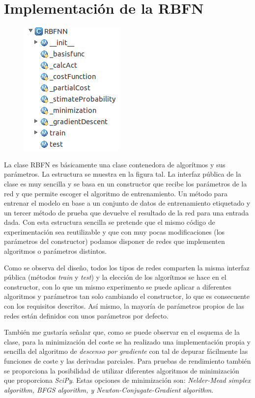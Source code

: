 \documentclass[10pt,a4paper]{report}
\begin{document}
\section{Implementación de la RBFN}
\begin{figure}[!h]{}
    \centering
    \includegraphics[scale=0.6]{img/RBFNScheme.png}
\end{figure}
La clase RBFN es básicamente una clase contenedora de algorítmos y sus parámetros. La estructura se muestra en la figura tal. La interfaz pública de la clase es muy sencilla y se basa en un constructor que recibe los parámetros de la red y que permite escoger el algoritmo de entrenamiento. Un método para entrenar el modelo en base a un conjunto de datos de entrenamiento etiquetado y un tercer método de prueba que devuelve el resultado de la red para una entrada dada.
Con esta estructura sencilla se pretende que el mismo código de experimentación sea reutilizable y que con muy pocas modificaciones (los parámetros del constructor) podamos disponer de redes que implementen algoritmos o parámetros distintos.

Como se observa del diseño, todos los tipos de redes comparten la misma interfaz pública (métodos \textit{train} y \textit{test}) y la elección de los algorítmos se hace en el constructor, con lo que un mismo experimento se puede aplicar a diferentes algoritmos y parámetros tan solo cambiando el constructor, lo que es consecuente con los requisitos descritos. Así mismo, la mayoría de parámetros propios de las redes están definidos con unos parámetros por defecto.

También me gustaría señalar que, como se puede observar en el esquema de la clase, para la minimización del coste se ha realizado una implementación propia y sencilla del algoritmo de \textit{descenso por gradiente} con tal de depurar fácilmente las funciones de coste y las derivadas parciales. Para pruebas de rendimiento también se proporciona la posibilidad de utilizar diferentes algoritmos de minimización que proporciona \textit{SciPy}. Estas opciones de minimización son: \textit{Nelder-Mead simplex algorithm, BFGS algorithm, y Newton-Conjugate-Gradient algorithm}.
\end{document}
